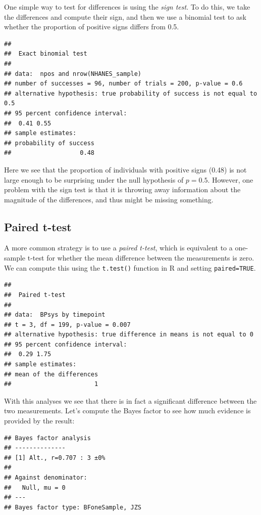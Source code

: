 \documentclass[12pt,]{book}
\theoremstyle{definition}
\theoremstyle{definition}
\theoremstyle{definition}
\theoremstyle{remark}
\begin{document}
One simple way to test for differences is using the \emph{sign test}. To do this, we take the differences and compute their sign, and then we use a binomial test to ask whether the proportion of positive signs differs from 0.5.

\begin{verbatim}
## 
##  Exact binomial test
## 
## data:  npos and nrow(NHANES_sample)
## number of successes = 96, number of trials = 200, p-value = 0.6
## alternative hypothesis: true probability of success is not equal to 0.5
## 95 percent confidence interval:
##  0.41 0.55
## sample estimates:
## probability of success 
##                   0.48
\end{verbatim}

Here we see that the proportion of individuals with positive signs (0.48) is not large enough to be surprising under the null hypothesis of \(p=0.5\). However, one problem with the sign test is that it is throwing away information about the magnitude of the differences, and thus might be missing something.

\hypertarget{paired-t-test}{%
\subsection{Paired t-test}\label{paired-t-test}}

A more common strategy is to use a \emph{paired t-test}, which is equivalent to a one-sample t-test for whether the mean difference between the measurements is zero. We can compute this using the \texttt{t.test()} function in R and setting \texttt{paired=TRUE}.

\begin{verbatim}
## 
##  Paired t-test
## 
## data:  BPsys by timepoint
## t = 3, df = 199, p-value = 0.007
## alternative hypothesis: true difference in means is not equal to 0
## 95 percent confidence interval:
##  0.29 1.75
## sample estimates:
## mean of the differences 
##                       1
\end{verbatim}

With this analyses we see that there is in fact a significant difference between the two measurements. Let's compute the Bayes factor to see how much evidence is provided by the result:

\begin{verbatim}
## Bayes factor analysis
## --------------
## [1] Alt., r=0.707 : 3 ±0%
## 
## Against denominator:
##   Null, mu = 0 
## ---
## Bayes factor type: BFoneSample, JZS
\end{verbatim}
\end{document}
